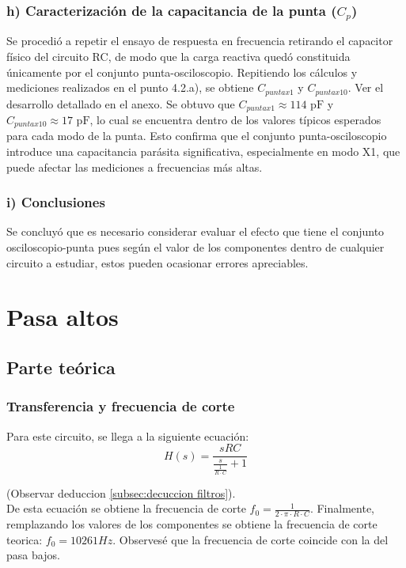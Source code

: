 \documentclass{article}
\begin{document}
        \subsubsection*{h) Caracterización de la capacitancia de la punta ($C_p$)}

Se procedió a repetir el ensayo de respuesta en frecuencia retirando el capacitor físico del circuito RC, de modo que la carga reactiva quedó constituida únicamente por el conjunto punta-osciloscopio.
Repitiendo los cálculos y mediciones realizados en el punto 4.2.a), se obtiene $C_{punta x1}$ y $C_{punta x10}$.
Ver el desarrollo detallado en el anexo.
Se obtuvo que $C_{punta x1} \approx 114\text{ pF}$ y $C_{punta x10} \approx 17\text{ pF}$, lo cual se encuentra dentro de los valores típicos esperados para cada modo de la punta. Esto confirma que el conjunto punta-osciloscopio introduce una capacitancia parásita significativa, especialmente en modo X1, que puede afectar las mediciones a frecuencias más altas.

\subsubsection*{i) Conclusiones}
Se concluyó que es necesario considerar evaluar el efecto que tiene el conjunto osciloscopio-punta
pues según el valor de los componentes dentro de cualquier circuito a estudiar, estos pueden ocasionar errores apreciables.

               

\section{Pasa altos}
    \subsection{Parte teórica}
        \subsubsection{Transferencia y frecuencia de corte}
            Para este circuito, se llega a la siguiente ecuación: 
    \begin{equation}
H(s)=\frac{sRC}{\frac{s}{\frac{1}{R \cdot C}}+1}
\label{eq:pasaaltos}
\end{equation}

    (Observar deduccion \ref{subsec:decuccion filtros}).\\
    De esta ecuación se obtiene la frecuencia de corte $ f_0 = \frac{1}{2 \cdot \pi \cdot R \cdot C} $. Finalmente, remplazando los valores de los componentes se obtiene la frecuencia de corte teorica: $f_0= 10261 Hz$. Observesé que la frecuencia de corte coincide con la del pasa bajos.
\end{document}
